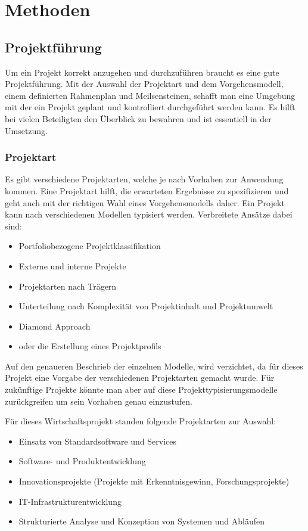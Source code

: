 \documentclass[a4paper, table]{article}
\begin{document}
\newpage
\section{Methoden}

\subsection{Projektführung}
Um ein Projekt korrekt anzugehen und durchzuführen braucht es eine gute Projektführung.
Mit der Auswahl der Projektart und dem Vorgehensmodell, einem definierten Rahmenplan und Meilsensteinen,
schafft man eine Umgebung mit der ein Projekt geplant und kontrolliert durchgeführt werden kann.
Es hilft bei vielen Beteiligten den Überblick zu bewahren und ist essentiell in der Umsetzung.

\subsubsection{Projektart}
Es gibt verschiedene Projektarten, welche je nach Vorhaben zur Anwendung kommen. Eine Projektart hilft, die erwarteten Ergebnisse zu spezifizieren
und geht auch mit der richtigen Wahl eines Vorgehensmodells daher.
\newline
Ein Projekt kann nach verschiedenen Modellen typisiert werden. Verbreitete Ansätze dabei sind:
\begin{itemize}
    \item Portfoliobezogene Projektklassifikation
    \item Externe und interne Projekte
    \item Projektarten nach Trägern
    \item Unterteilung nach Komplexität von Projektinhalt und Projektumwelt
    \item Diamond Approach
    \item oder die Erstellung eines Projektprofils\autocite{claus_husselmann_zielgerichtete_nodate} %
\end{itemize}
Auf den genaueren Beschrieb der einzelnen Modelle, wird verzichtet, da für dieses Projekt eine Vorgabe der verschiedenen Projektarten gemacht wurde.
Für zukünftige Projekte könnte man aber auf diese Projekttypisierungsmodelle zurückgreifen um sein Vorhaben genau einzustufen.
\newline

Für dieses Wirtschaftsprojekt standen folgende Projektarten zur Auswahl:
\begin{itemize}
    \item Einsatz von Standardsoftware und Services
    \item Software- und Produktentwicklung
    \item Innovationsprojekte (Projekte mit Erkenntnisgewinn, Forschungsprojekte)
    \item IT-Infrastrukturentwicklung
    \item Strukturierte Analyse und Konzeption von Systemen und Abläufen \autocite{oliver_gilbert_wipro_2022} %
\end{itemize}
\end{document}

